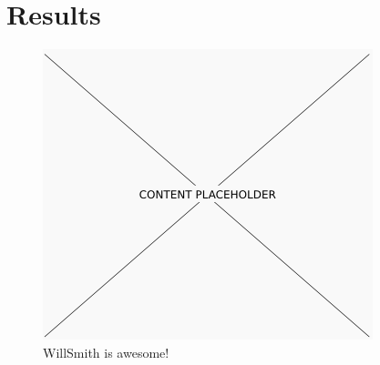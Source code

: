 \section{Results}
\label{sec:results}

\begin{figure}[h!]
  \centering
    \includegraphics[width=\columnwidth]{figures/placeholder.png}
  \caption{WillSmith is awesome!}
  \label{fig:placeholder}
\end{figure}

